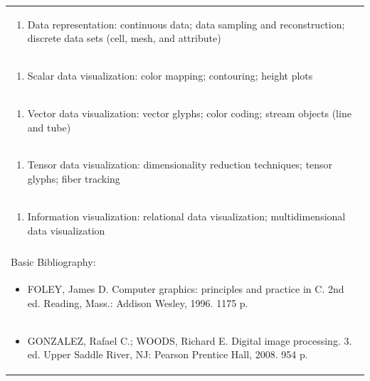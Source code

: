 \documentclass[11pt]{article}
\begin{document}
\begin{center}
\begin{longtable}{|p{4cm}|p{4cm}|p{4cm}|p{4cm}|}
\multicolumn{4}{|p{\dimexpr 16cm + 6\tabcolsep\relax}|}{\begin{enumerate}[start=2]\item Data representation: continuous data; data sampling and reconstruction; discrete data sets (cell, mesh, and attribute)\end{enumerate}}\\
\multicolumn{4}{|p{\dimexpr 16cm + 6\tabcolsep\relax}|}{\begin{enumerate}[start=3]\item Scalar data visualization: color mapping; contouring; height plots\end{enumerate}}\\
\multicolumn{4}{|p{\dimexpr 16cm + 6\tabcolsep\relax}|}{\begin{enumerate}[start=4]\item Vector data visualization: vector glyphs; color coding; stream objects (line and tube)\end{enumerate}}\\
\multicolumn{4}{|p{\dimexpr 16cm + 6\tabcolsep\relax}|}{\begin{enumerate}[start=5]\item Tensor data visualization: dimensionality reduction techniques; tensor glyphs; fiber tracking\end{enumerate}}\\
\multicolumn{4}{|p{\dimexpr 16cm + 6\tabcolsep\relax}|}{\begin{enumerate}[start=6]\item Information visualization: relational data visualization; multidimensional data visualization\end{enumerate}}\\
\multicolumn{4}{|p{\dimexpr 16cm + 6\tabcolsep\relax}|}{}\\
\hline
\multicolumn{4}{|p{16cm}|}{Basic Bibliography:}\\*
\multicolumn{4}{|p{\dimexpr 16cm + 6\tabcolsep\relax}|}{\begin{itemize}\item FOLEY, James D. Computer graphics: principles and practice in C. 2nd ed. Reading, Mass.: Addison Wesley, 1996. 1175 p.\end{itemize}}\\
\multicolumn{4}{|p{\dimexpr 16cm + 6\tabcolsep\relax}|}{\begin{itemize}\item GONZALEZ, Rafael C.; WOODS, Richard E. Digital image processing. 3. ed. Upper Saddle River, NJ: Pearson Prentice Hall, 2008. 954 p.\end{itemize}}\\

\end{longtable}
\end{center}
\end{document}
